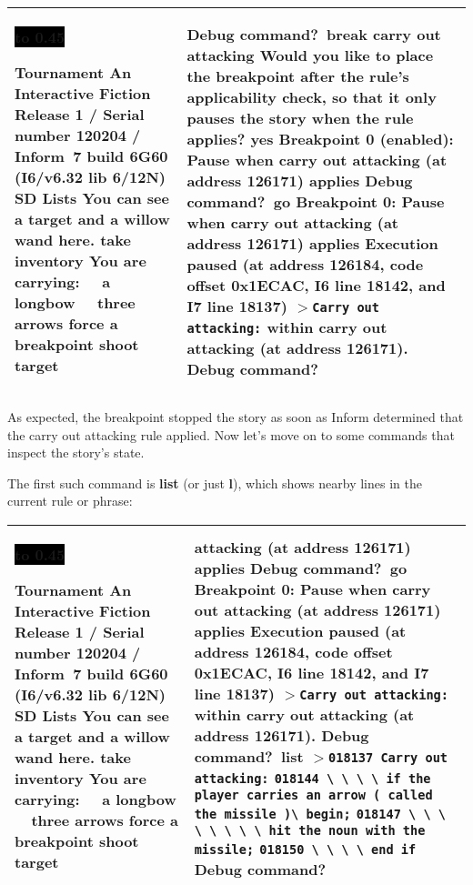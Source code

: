 \documentclass{book}
\newcommand{\n}{\hspace*{\fill}\newline}
\newcommand{\terp}[2]{\begin{center}\begin{tabular}{p{0.45\textwidth}|p{0.45\textwidth}}\midrule #1&#2\\\midrule\end{tabular}\end{center}}
\newcommand{\glkheading}[1]{\textbf{#1}}
\newcommand{\glkinput}[1]{\textbf{#1}}
\newcommand{\glkstatusline}[2]{\centerline{\colorbox{black}{\hbox to 0.45\textwidth{\textcolor{white}{#1\hfil #2}}}}}
\newcommand{\storyprompt}{\raisebox{1.5pt}{\(>\)}}
\newcommand{\cursor}{\raisebox{-1.5pt}{\RectangleThin}}
\newcommand{\markedindent}{\(>\)\qquad}
\newcommand{\unmarkedindent}{\hphantom{\(>\)}\qquad}
\begin{document}
\terp{\glkstatusline{Lists}{0/2}\n
  \glkheading{Tournament}\n
  An Interactive Fiction\n
  Release 1 / Serial number 120204 / Inform~7 build 6G60 (I6/v6.32 lib 6/12N) SD\n
  \n
  \glkheading{Lists}\n
  You can see a target and a willow wand here.\n
  \n
  \storyprompt\glkinput{take inventory}\n
  You are carrying:\n
  \null\ \ a longbow\n
  \null\ \ three arrows\n
  \n
  \storyprompt\glkinput{force a breakpoint}\n
  \storyprompt\glkinput{shoot target}}{%
  \n
  Debug command?\ \glkinput{break carry out attacking}\n
  \n
  Would you like to place the breakpoint after the rule's applicability check, so that it only pauses the story when the rule applies? \glkinput{yes}\n
  \n
  Breakpoint 0 (enabled): Pause when carry out attacking (at address 126171) applies\n
  \n
  Debug command?\ \glkinput{go}\n
  \n
  \glkheading{Breakpoint 0:} Pause when carry out attacking (at address 126171) applies\n
  \n
  Execution paused (at address 126184, code offset 0x1ECAC, I6 line 18142, and I7 line 18137)\n
  \markedindent \lstinline{Carry out attacking:}\n
  within carry out attacking (at address 126171).\n
  \n
  Debug command?\ \cursor}

As expected, the breakpoint stopped the story as soon as Inform determined that
the carry out attacking rule applied.  Now let's move on to some commands that
inspect the story's state.

The first such command is \glkinput{list} (or just \glkinput{l}), which shows
nearby lines in the current rule or phrase:

\terp{\glkstatusline{Lists}{0/2}\n
  \glkheading{Tournament}\n
  An Interactive Fiction\n
  Release 1 / Serial number 120204 / Inform~7 build 6G60 (I6/v6.32 lib 6/12N) SD\n
  \n
  \glkheading{Lists}\n
  You can see a target and a willow wand here.\n
  \n
  \storyprompt\glkinput{take inventory}\n
  You are carrying:\n
  \null\ \ a longbow\n
  \null\ \ three arrows\n
  \n
  \storyprompt\glkinput{force a breakpoint}\n
  \storyprompt\glkinput{shoot target}}{%
  attacking (at address 126171) applies\n
  \n
  Debug command?\ \glkinput{go}\n
  \n
  \glkheading{Breakpoint 0:} Pause when carry out attacking (at address 126171) applies\n
  \n
  Execution paused (at address 126184, code offset 0x1ECAC, I6 line 18142, and I7 line 18137)\n
  \markedindent \lstinline{Carry out attacking:}\n
  within carry out attacking (at address 126171).\n
  \n
  Debug command?\ \glkinput{list}\n
  \n
  \markedindent \lstinline{018137 Carry out attacking:}\n
  \unmarkedindent \lstinline{018144 \ \ \ \ if the player carries an arrow ( called the missile )}\lstinline{\ begin;}\n
  \unmarkedindent \lstinline{018147 \ \ \ \ \ \ \ \ hit the noun with the missile;}\n
  \unmarkedindent \lstinline{018150 \ \ \ \ end if}\n
  \n
  Debug command?\ \cursor}
\end{document}
